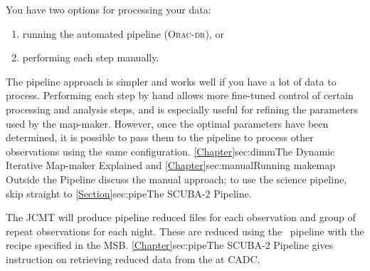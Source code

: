You have two options for processing your data:

\begin{enumerate}
\item running the automated pipeline (\textsc{Orac-dr}), or
\item performing each step manually.
\end{enumerate}

The pipeline approach is simpler and works well if you have a
lot of data to process.
Performing each step by hand allows more fine-tuned control of certain
processing and analysis steps, and is especially useful for refining
the parameters used by the map-maker. However, once the optimal
parameters have been determined, it is possible to pass them to the
pipeline to process other observations using the same configuration.
\cref{Chapter}{sec:dimm}{The Dynamic Iterative Map-maker
Explained} and \cref{Chapter}{sec:manual}{Running makemap Outside the
Pipeline} discuss the manual approach; to use the science pipeline,
skip straight to \cref{Section}{sec:pipe}{The SCUBA-2 Pipeline}.

The JCMT will produce pipeline reduced files for each observation and
group of repeat observations for each night. These are reduced using
the \oracdr\ pipeline with the recipe specified in the MSB.
\cref{Chapter}{sec:pipe}{The SCUBA-2 Pipeline} gives instruction on
retrieving reduced data from the  at
CADC.

